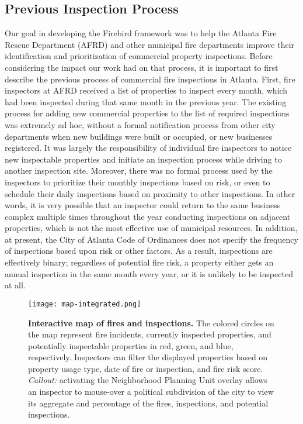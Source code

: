 \documentclass{sig-alternate-05-2015}
\begin{document}
{\subsection{Previous Inspection Process}
Our goal in developing the Firebird framework was to help the Atlanta Fire Rescue Department (AFRD) and other municipal fire departments improve their identification and prioritization of commercial property inspections. Before considering the impact our work had on that process, it is important to first describe the previous process of commercial fire inspections in Atlanta. First, fire inspectors at AFRD received a list of properties to inspect every month, which had been inspected during that same month in the previous year. The existing process for adding new commercial properties to the list of required inspections was extremely ad hoc, without a formal notification process from other city departments when new buildings were built or occupied, or new businesses registered. It was largely the responsibility of individual fire inspectors to notice new inspectable properties and initiate an inspection process while driving to another inspection site. Moreover, there was no formal process used by the inspectors to prioritize their monthly inspections based on risk, or even to schedule their daily inspections based on proximity to other inspections. In other words, it is very possible that an inspector could return to the same business complex multiple times throughout the year conducting inspections on adjacent properties, which is not the most effective use of municipal resources. In addition, at present, the City of Atlanta Code of Ordinances does not specify the frequency of inspections based upon risk or other factors. As a result, inspections are effectively binary; regardless of potential fire risk, a property either gets an annual inspection in the same month every year, or it is unlikely to be inspected at all.


\begin{figure*}
\centering
    \texttt{[image: map-integrated.png]}
\caption{\textbf{Interactive map of fires and inspections.} 
The colored circles on the map represent fire incidents, currently inspected properties, and potentially inspectable properties in red, green, and blue, respectively. 
Inspectors can filter the displayed properties based on property usage type, date of fire or inspection, and fire risk score.
\textit{Callout:} activating the Neighborhood Planning Unit overlay allows an inspector to mouse-over a political subdivision of the city to view its aggregate and percentage of the fires, inspections, and potential inspections.
}
\label{fig:map}
\end{figure*}


}
\end{document}
